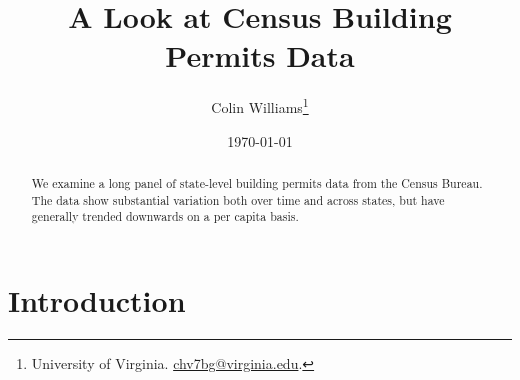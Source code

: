 \documentclass[12pt]{article}
\title{A Look at Census Building Permits Data}
\author{Colin Williams\thanks{University of Virginia.
\href{mailto:chv7bg@virginia.edu}{chv7bg@virginia.edu}.}} %
\date{\today}
\begin{document}
\bgroup
\let\footnoterule\relax

\begin{singlespace}
\maketitle

\begin{abstract}
\noindent We examine a long panel of state-level building permits data from the Census Bureau. The data show substantial variation both over time and across states, but have generally trended downwards on a per capita basis.
\end{abstract}
\end{singlespace}

\thispagestyle{empty}
\clearpage
\egroup
\setcounter{page}{1}


\noindent

\section{Introduction}
\end{document}
